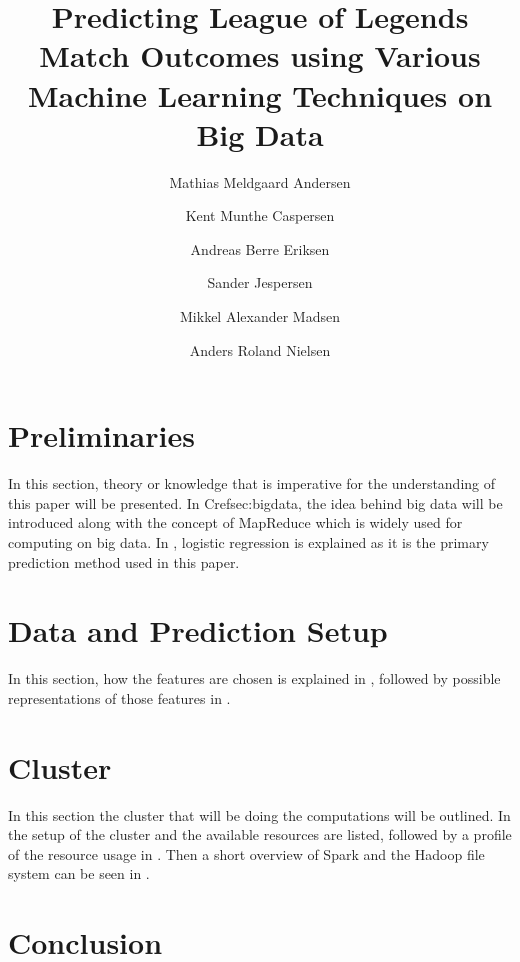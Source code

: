 \documentclass[columns=,boxcolor=white]{datart}
\title{Predicting League of Legends Match Outcomes using Various Machine Learning Techniques on Big Data}
\date{}
\author[1]{Mathias Meldgaard Andersen}
\author[1]{Kent Munthe Caspersen}
\author[1]{Andreas Berre Eriksen}
\author[1]{Sander Jespersen}
\author[1]{Mikkel Alexander Madsen}
\author[1]{Anders Roland Nielsen}
\affil[1]{Department of Computer Science, Aalborg University}
\begin{document}
\usetikzlibrary{arrows,intersections,shapes.geometric,calc}
\maketitle







\section{Preliminaries}\label{sec:prelim}
In this section, theory or knowledge that is imperative for the understanding of this paper will be presented. In Cref{sec:bigdata}, the idea behind big data will be introduced along with the concept of MapReduce which is widely used for computing on big data. In , logistic regression is explained as it is the primary prediction method used in this paper.





\section{Data and Prediction Setup}\label{sec:features}
In this section, how the features are chosen is explained in , followed by possible representations of those features in . 




\section{Cluster}\label{sec:cluster}
In this section the cluster that will be doing the computations will be outlined. In  the setup of the cluster and the available resources are listed, followed by a profile of the resource usage in . Then a short overview of Spark and the Hadoop file system can be seen in .







\section{Conclusion}





\newpage
\appendix



\end{document}
